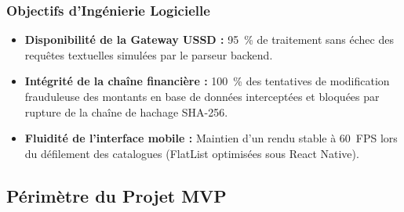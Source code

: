 \documentclass[12pt,a4paper]{report}
\begin{document}
\subsubsection{Objectifs d'Ingénierie Logicielle}

\begin{itemize}
  \item \textbf{Disponibilité de la Gateway USSD :} 95~\% de traitement sans échec des requêtes textuelles simulées par le parseur backend.
  \item \textbf{Intégrité de la chaîne financière :} 100~\% des tentatives de modification frauduleuse des montants en base de données interceptées et bloquées par rupture de la chaîne de hachage SHA-256.
  \item \textbf{Fluidité de l'interface mobile :} Maintien d'un rendu stable à 60~FPS lors du défilement des catalogues (FlatList optimisées sous React Native).
\end{itemize}

\subsection{Périmètre du Projet MVP}
\end{document}
